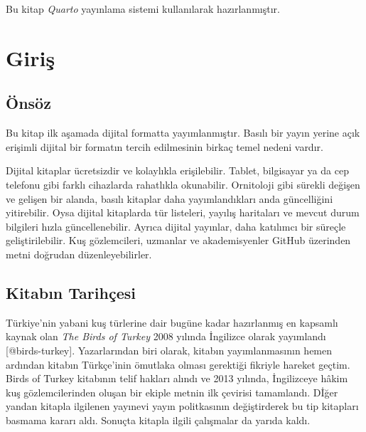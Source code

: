 \documentclass[
  10.5pt,
  a4paper,
  DIV=11,
  numbers=noendperiod,
  twocolumn]{scrreprt}
\begin{document}
Bu kitap \emph{Quarto} yayınlama sistemi kullanılarak hazırlanmıştır.

\part{Giriş}

\chapter*{Önsöz}\label{uxf6nsuxf6z}


Bu kitap ilk aşamada dijital formatta yayımlanmıştır. Basılı bir yayın
yerine açık erişimli dijital bir formatın tercih edilmesinin birkaç
temel nedeni vardır.

Dijital kitaplar ücretsizdir ve kolaylıkla erişilebilir. Tablet,
bilgisayar ya da cep telefonu gibi farklı cihazlarda rahatlıkla
okunabilir. Ornitoloji gibi sürekli değişen ve gelişen bir alanda,
basılı kitaplar daha yayımlandıkları anda güncelliğini yitirebilir. Oysa
dijital kitaplarda tür listeleri, yayılış haritaları ve mevcut durum
bilgileri hızla güncellenebilir. Ayrıca dijital yayınlar, daha katılımcı
bir süreçle geliştirilebilir. Kuş gözlemcileri, uzmanlar ve
akademisyenler GitHub üzerinden metni doğrudan düzenleyebilirler.

\chapter*{Kitabın Tarihçesi}\label{kitabux131n-tarihuxe7esi}


Türkiye'nin yabani kuş türlerine dair bugüne kadar hazırlanmış en
kapsamlı kaynak olan \emph{The Birds of Turkey} 2008 yılında İngilizce
olarak yayımlandı {[}@birds-turkey{]}. Yazarlarından biri olarak,
kitabın yayımlanmasının hemen ardından kitabın Türkçe'inin ömutlaka
olması gerektiği fikriyle hareket geçtim. Birds of Turkey kitabının
telif hakları alındı ve 2013 yılında, İngilizceye hâkim kuş
gözlemcilerinden oluşan bir ekiple metnin ilk çevirisi tamamlandı. Dİğer
yandan kitapla ilgilenen yayınevi yayın politkasının değiştirderek bu
tip kitapları basmama kararı aldı. Sonuçta kitapla ilgili çalışmalar da
yarıda kaldı.
\end{document}
